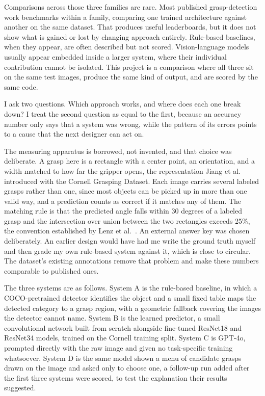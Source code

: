 \documentclass[12pt,letterpaper]{article}
\begin{document}
Comparisons across those three families are rare. Most published grasp-detection work benchmarks within a family,
comparing one trained architecture against another on the same dataset.
That produces useful leaderboards, but it does not show what is gained
or lost by changing approach entirely. Rule-based baselines, when
they appear, are often described but not scored. Vision-language
models usually appear embedded inside a larger system, where their
individual contribution cannot be isolated. This project is a
comparison where all three sit on the same test images, produce the
same kind of output, and are scored by the same code.

I ask two questions. Which approach works, and where does each one
break down? I treat the second question as equal to the first, because
an accuracy number only says that a system was wrong, while the pattern
of its errors points to a cause that the next designer can act on.

The measuring apparatus is borrowed, not invented, and that choice was
deliberate. A grasp here is a rectangle with a center
point, an orientation, and a width matched to how far the gripper
opens, the representation Jiang et al.~\cite{jiang2011} introduced with the Cornell
Grasping Dataset. Each image carries several labeled grasps
rather than one, since most objects can be picked up in more than one
valid way, and a prediction counts as correct if it matches any of
them. The matching rule is that the predicted angle falls within 30
degrees of a labeled grasp and the intersection over union between the
two rectangles exceeds 25\%, the convention established by Lenz et al.~\cite{lenz2015}. An external answer key was chosen deliberately. An earlier
design would have had me write the ground truth myself and then grade
my own rule-based system against it, which is close to circular. The
dataset's existing annotations remove that problem and make these
numbers comparable to published ones.

The three systems are as follows. System A is the rule-based baseline,
in which a COCO-pretrained detector identifies the object and a small
fixed table maps the detected category to a grasp region, with a
geometric fallback covering the images the detector cannot name. System
B is the learned predictor, a small convolutional network built from
scratch alongside fine-tuned ResNet18 and ResNet34 models, trained on
the Cornell training split. System C is GPT-4o, prompted directly with
the raw image and given no task-specific training whatsoever. System D
is the same model shown a menu of candidate grasps drawn on the image
and asked only to choose one, a follow-up run added after the first
three systems were scored, to test the explanation their results
suggested.
\end{document}
